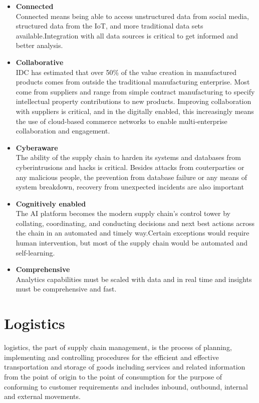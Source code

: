 \begin{itemize}
	\item \textbf{Connected}\\
	Connected means being able to access
	unstructured data from social media, structured data from the IoT, and more traditional data sets
	available.Integration with all data sources is critical to get informed and better analysis.
	\item \textbf{ Collaborative}\\
	IDC has estimated that over 50\% of the value creation in manufactured products
	comes from outside the traditional manufacturing enterprise. Most come from suppliers and range
	from simple contract manufacturing to specify intellectual property contributions to new products.
	Improving collaboration with suppliers is
	critical, and in the digitally enabled,  this increasingly means the use of cloud-based commerce networks to enable multi-enterprise collaboration and engagement.
	\item \textbf{Cyberaware}\\The ability of the supply chain to harden its systems and databases from cyberintrusions and hacks is critical. Besides attacks from couterparties or any malicious people, the prevention from database failure or any means of system breakdown, recovery from unexpected incidents are also important
	\item \textbf{Cognitively enabled}\\
	The AI platform becomes the modern supply chain's control tower by
	collating, coordinating, and conducting decisions and next best actions across the chain in an
	automated and timely way.Certain exceptions would require human
	intervention, but most of the supply chain would be automated and self-learning.
	\item \textbf{Comprehensive}\\
	Analytics capabilities must be scaled with data and in real time and insights must be comprehensive and fast.
\end{itemize}

\section{Logistics}
logistics, the part of supply chain management, is the process of planning, implementing and controlling procedures for the efficient and effective transportation and storage of goods including services and related information from the point of origin to the point of consumption for the purpose of conforming to customer requirements and includes inbound, outbound, internal and external movements.

